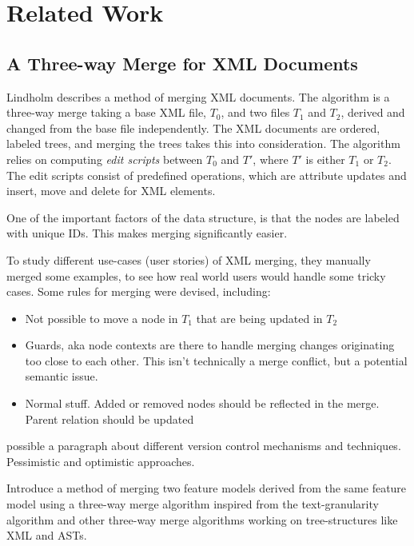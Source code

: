 \documentclass[a4paper,english]{ifimaster}
\begin{document}
\section{Related Work}%
\label{sec:related_work}

\subsection{A Three-way Merge for XML Documents}%
\label{sub:_a_three_way_merge_for_xml_documents}

Lindholm describes a method of merging XML documents. The algorithm is a three-way merge taking a base XML file, $T_0$, and two files $T_1$ and $T_2$, derived and changed from the base file independently. The XML documents are ordered, labeled trees, and merging the trees takes this into consideration. The algorithm relies on computing \textit{edit scripts} between $T_0$ and $T'$, where $T'$ is either $T_1$ or $T_2$. The edit scripts consist of predefined operations, which are attribute updates and insert, move and delete for XML elements.

One of the important factors of the data structure, is that the nodes are labeled with unique IDs. This makes merging significantly easier.

To study different use-cases (user stories) of XML merging, they manually merged some examples, to see how real world users would handle some tricky cases. Some rules for merging were devised, including:

\begin{itemize}
	\item Not possible to move a node in $T_1$ that are being updated in $T_2$
	\item Guards, aka node contexts are there to handle merging changes originating too close to each other. This isn't technically a merge conflict, but a potential semantic issue.
	\item Normal stuff. Added or removed nodes should be reflected in the merge. Parent relation should be updated
\end{itemize}


possible a paragraph about different version control mechanisms and techniques. Pessimistic and optimistic approaches. \cite{cite:tom_mens_software_merging_survey}

Introduce a method of merging two feature models derived from the same feature model using a three-way merge algorithm inspired from the text-granularity algorithm and other three-way merge algorithms working on tree-structures like XML and ASTs.
\end{document}
